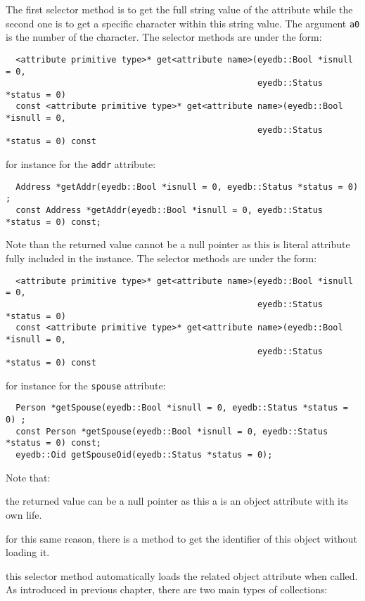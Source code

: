 The first selector method is to get the full string value of the attribute
while the second one is to get a specific character within this string value.
The argument \texttt{a0} is the number of the character.
The selector methods are under the form:
\verbsize
\begin{verbatim}
  <attribute primitive type>* get<attribute name>(eyedb::Bool *isnull = 0,
                                                  eyedb::Status *status = 0)
  const <attribute primitive type>* get<attribute name>(eyedb::Bool *isnull = 0,
                                                  eyedb::Status *status = 0) const
\end{verbatim}
\normalsize
for instance for the \texttt{addr} attribute:
\verbsize
\begin{verbatim}
  Address *getAddr(eyedb::Bool *isnull = 0, eyedb::Status *status = 0) ;
  const Address *getAddr(eyedb::Bool *isnull = 0, eyedb::Status *status = 0) const;
\end{verbatim}
\normalsize
Note than the returned value cannot be a null pointer as this is literal
attribute fully included in the instance.
The selector methods are under the form:
\verbsize
\begin{verbatim}
  <attribute primitive type>* get<attribute name>(eyedb::Bool *isnull = 0,
                                                  eyedb::Status *status = 0)
  const <attribute primitive type>* get<attribute name>(eyedb::Bool *isnull = 0,
                                                  eyedb::Status *status = 0) const
\end{verbatim}
\normalsize
for instance for the \texttt{spouse} attribute:
\verbsize
\begin{verbatim}
  Person *getSpouse(eyedb::Bool *isnull = 0, eyedb::Status *status = 0) ;
  const Person *getSpouse(eyedb::Bool *isnull = 0, eyedb::Status *status = 0) const;
  eyedb::Oid getSpouseOid(eyedb::Status *status = 0);
\end{verbatim}
\normalsize
Note that:
\be
\item the returned value can be a null pointer as this a is
an object attribute with its own life.
\item for this same reason, there is a method to get the identifier of this
object without loading it.
\item this selector method automatically loads the related object attribute
when called.
\ee
{}
As introduced in previous chapter, there are two main types of collections:
